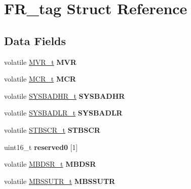 \hypertarget{structFR__tag}{}\section{F\+R\+\_\+tag Struct Reference}
\label{structFR__tag}
\subsection*{Data Fields}
\begin{DoxyCompactItemize}
\item 
\mbox{\label{structFR__tag_af73891a079acadbf7099af0e79d8c46d}} 
volatile \mbox{\hyperlink{unionuMVR}{M\+V\+R\+\_\+t}} {\bfseries M\+VR}
\item 
\mbox{\label{structFR__tag_aa1d5852754c9d76980272c674ac7a9ce}} 
volatile \mbox{\hyperlink{unionuMCR}{M\+C\+R\+\_\+t}} {\bfseries M\+CR}
\item 
\mbox{\label{structFR__tag_a42a8be553ea9f11bcba45f12ab28e7d6}} 
volatile \mbox{\hyperlink{unionuSYSBADHR}{S\+Y\+S\+B\+A\+D\+H\+R\+\_\+t}} {\bfseries S\+Y\+S\+B\+A\+D\+HR}
\item 
\mbox{\label{structFR__tag_ad71adce4aaa5040ba9b44ce96f4cf634}} 
volatile \mbox{\hyperlink{unionuSYSBADLR}{S\+Y\+S\+B\+A\+D\+L\+R\+\_\+t}} {\bfseries S\+Y\+S\+B\+A\+D\+LR}
\item 
\mbox{\label{structFR__tag_a4c27e7db3c9b965a0f1b8bed23f14ca3}} 
volatile \mbox{\hyperlink{unionuSTBSCR}{S\+T\+B\+S\+C\+R\+\_\+t}} {\bfseries S\+T\+B\+S\+CR}
\item 
\mbox{\label{structFR__tag_a094d5384d2b3267c2f14ce53d5398996}} 
uint16\+\_\+t {\bfseries reserved0} \mbox{[}1\mbox{]}
\item 
\mbox{\label{structFR__tag_a7ed301797b3f57b86a91ad0890a660c1}} 
volatile \mbox{\hyperlink{unionuMBDSR}{M\+B\+D\+S\+R\+\_\+t}} {\bfseries M\+B\+D\+SR}
\item 
\mbox{\label{structFR__tag_a73ee1f8c1ec25d4098048bac4e8a348d}} 
volatile \mbox{\hyperlink{unionuMBSSUTR}{M\+B\+S\+S\+U\+T\+R\+\_\+t}} {\bfseries M\+B\+S\+S\+U\+TR}
\item 

\end{DoxyCompactItemize}
